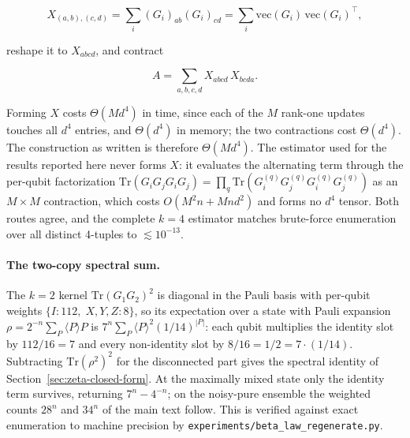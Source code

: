 \documentclass[a4paper,superscriptaddress,nofootinbib,onecolumn,nopdfoutputerror]{quantumarticle}
\begin{document}
\[X_{(a,b),(c,d)} = \sum_i (G_i)_{ab} (G_i)_{cd} = \sum_i \mathrm{vec}(G_i)\,\mathrm{vec}(G_i)^{\!\top},\]

reshape it to \(X_{abcd}\), and contract

\[A = \sum_{a,b,c,d} X_{abcd}\, X_{bcda}.\]

Forming \(X\) costs \(\Theta(M d^4)\) in time, since each of the \(M\)
rank-one updates touches all \(d^4\) entries, and \(\Theta(d^4)\) in
memory; the two contractions cost \(\Theta(d^4)\). The construction as
written is therefore \(\Theta(M d^4)\). The estimator used for the
results reported here never forms \(X\): it evaluates the alternating
term through the per-qubit factorization
\(\mathrm{Tr}(G_i G_j G_i G_j) = \prod_q \mathrm{Tr}(G_i^{(q)} G_j^{(q)} G_i^{(q)} G_j^{(q)})\)
as an \(M \times M\) contraction, which costs \(O(M^2 n + M n d^2)\) and
forms no \(d^4\) tensor. Both routes agree, and the complete \(k=4\)
estimator matches brute-force enumeration over all distinct 4-tuples to
\(\lesssim 10^{-13}\).

\paragraph{The two-copy spectral sum.}
The \(k=2\) kernel \(\mathrm{Tr}(G_1 G_2)^2\) is diagonal in the Pauli
basis with per-qubit weights \(\{I : 112,\; X,Y,Z : 8\}\), so its
expectation over a state with Pauli expansion
\(\rho = 2^{-n}\sum_P \langle P\rangle P\) is
\(7^{n} \sum_P \langle P\rangle^2 (1/14)^{|P|}\): each qubit multiplies
the identity slot by \(112/16 = 7\) and every non-identity slot by
\(8/16 = 1/2 = 7\cdot(1/14)\). Subtracting \(\mathrm{Tr}(\rho^2)^2\) for
the disconnected part gives the spectral identity of
Section~\ref{sec:zeta-closed-form}. At the maximally mixed state only the
identity term survives, returning \(7^n - 4^{-n}\); on the noisy-pure
ensemble the weighted counts \(28^n\) and \(34^n\) of the main text
follow. This is verified against exact enumeration to machine precision by
\texttt{experiments/beta\_law\_regenerate.py}.
\end{document}
